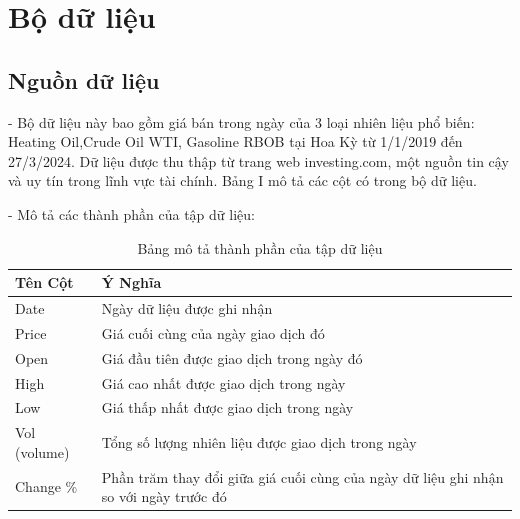 \documentclass[conference]{IEEEtran}
\begin{document}
\section{Bộ dữ liệu}
\subsection{Nguồn dữ liệu}
- Bộ dữ liệu này bao gồm giá bán trong ngày của 3 loại nhiên liệu phổ biến: Heating Oil,Crude Oil WTI, Gasoline RBOB tại Hoa Kỳ từ 1/1/2019 đến 27/3/2024. Dữ liệu được thu thập từ trang web investing.com, một nguồn tin cậy và uy tín trong lĩnh vực tài chính. Bảng I mô tả các cột có trong bộ dữ liệu.

- Mô tả các thành phần của tập dữ liệu:
\begin{table}[h!]
    \centering
        \caption{Bảng mô tả thành phần của tập dữ liệu}
    \renewcommand\arraystretch{1.5} %
    \begin{adjustbox}{max width=\linewidth}
    \begin{tabular}{|>{\centering}m{2.5cm}|m{7cm}|}
        \hline
        \textbf{Tên Cột} & \textbf{Ý Nghĩa} \\
        \hline
        Date  & Ngày dữ liệu được ghi nhận \\
        \hline
        Price  & Giá cuối cùng của ngày giao dịch đó \\
        \hline
        Open  & Giá đầu tiên được giao dịch trong ngày đó \\
        \hline
        High  & Giá cao nhất được giao dịch trong ngày \\
        \hline
        Low  & Giá thấp nhất được giao dịch trong ngày \\
        \hline
        Vol (volume)  & Tổng số lượng nhiên liệu được giao dịch trong ngày \\
        \hline
        Change \%  & Phần trăm thay đổi giữa giá cuối cùng của ngày dữ liệu ghi nhận so với ngày trước đó \\
        \hline
    \end{tabular}
    \end{adjustbox}
    \label{tab:data_description}
\end{table}
\end{document}
